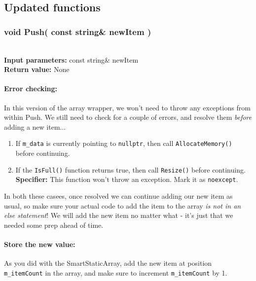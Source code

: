 \documentclass[a4paper,12pt]{book}
\begin{document}
    \newpage
    \subsection*{Updated functions}

    \subsubsection*{void Push( const string\& newItem )}

    \begin{framed} ~\\
        \textbf{Input parameters:} const string\& newItem \\
        \textbf{Return value:} None
    \end{framed}

    \paragraph{Error checking:} In this version of the array wrapper,
    we won't need to throw any exceptions from within Push. We still need
    to check for a couple of errors, and resolve them \textit{before} adding
    a new item...

    \begin{enumerate}
        \item If \texttt{m\_data} is currently pointing to \texttt{nullptr},
            then call \texttt{AllocateMemory()} before continuing.
        \item If the \texttt{IsFull()} function returns true, then call
            \texttt{Resize()} before continuing. \\
        \textbf{Specifier:} This function won't throw an exception. Mark it as \texttt{noexcept}.
    \end{enumerate}

    In both these casees, once resolved we can continue adding our new
    item as usual, so make sure your actual code to add the item to the
    array \textit{is not in an else statement}! We will add the new item
    no matter what - it's just that we needed some prep ahead of time.

    \paragraph{Store the new value:} As you did with the SmartStaticArray,
    add the new item at position \texttt{m\_itemCount} in the array,
    and make sure to increment \texttt{m\_itemCount} by 1.
    
\end{document}
